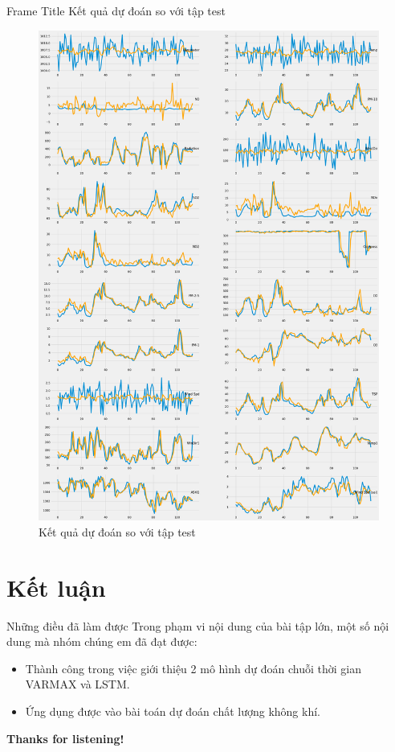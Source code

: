 \documentclass[notheorems,hyperref={bookmarks=true}]{beamer}
\theoremstyle{plain}
\numberwithin{equation}{section}
\begin{document}
\begin{footnotesize}
\begin{frame}{Frame Title}
    Kết quả dự đoán so với tập test
    \begin{figure}[H]
        \centering
        \includegraphics[width=.35\textwidth]{figures/VAR_test.png}
        \caption[Kết quả dự đoán so với tập test]{Kết quả dự đoán so với tập test}
    \end{figure}
	\end{frame}	
 

 
 
	\section{Kết luận}
	\begin{frame}{Những điều đã làm được}
	    Trong phạm vi nội dung của bài tập lớn, một số nội dung mà nhóm chúng em đã đạt được:
\begin{itemize}
    \item Thành công trong việc giới thiệu 2 mô hình dự đoán chuỗi thời gian VARMAX và LSTM. 
    \item Ứng dụng được vào bài toán dự đoán chất lượng không khí.
\end{itemize}
	\end{frame}

\end{footnotesize}
\begin{frame}{}
\centering
    \Huge{\textbf{Thanks for listening!}}
\end{frame}

   
\end{document}
